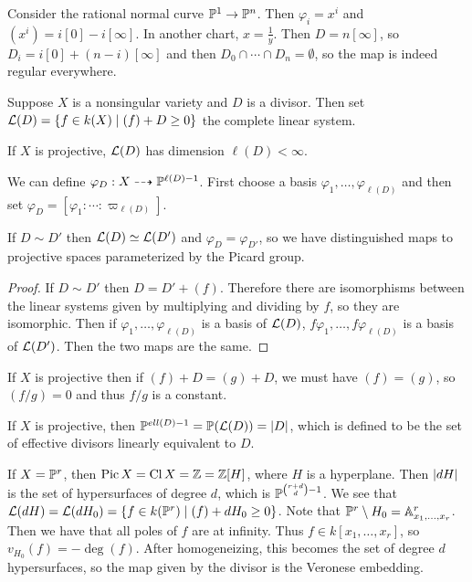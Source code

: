 \documentclass[twoside, 10pt]{article}
\begin{document}
        \begin{exm}
            Consider the rational normal curve $\P^1 \to \P^n$. Then $\varphi_i = x^i$ and $(x^i) = i[0]-i[\infty]$. In another chart, $x = \frac{1}{y}$. Then $D = n[\infty]$, so $D_i = i[0]+(n-i)[\infty]$ and then $D_0 \cap \cdots \cap D_n = \emptyset$, so the map is indeed regular everywhere.
        \end{exm}

        Suppose $X$ is a nonsingular variety and $D$ is a divisor. Then set $\mc{L}(D) = \{f \in k(X) \mid (f) + D \geq 0 \}$ the complete linear system.

        \begin{thm}[Serre]
            If $X$ is projective, $\mc{L}(D)$ has dimension $\ell(D) < \infty$.
        \end{thm}

        We can define $\varphi_D: X \dashrightarrow \P^{\ell(D)-1}$. First choose a basis $\varphi_1, \ldots, \varphi_{\ell(D)}$ and then set $\varphi_D = [\varphi_1: \cdots : \varpi_{\ell(D)}]$.

        \begin{lem}
            If $D \sim D'$ then $\mc{L}(D) \simeq \mc{L}(D')$ and $\varphi_D = \varphi_{D'}$, so we have distinguished maps to projective spaces parameterized by the Picard group.
            \begin{proof}
                If $D \sim D'$ then $D = D'+(f)$. Therefore there are isomorphisms between the linear systems given by multiplying and dividing by $f$, so they are isomorphic. Then if $\varphi_1, \ldots, \varphi_{\ell(D)}$ is a basis of $\mc{L}(D)$, $f \varphi_1, \ldots, f \varphi_{\ell(D)}$ is a basis of $\mc{L}(D')$. Then the two maps are the same.
            \end{proof}
        \end{lem}

        \begin{rmk}
            If $X$ is projective then if $(f)+D = (g)+D$, we must have $(f) = (g)$, so $(f/g) = 0$ and thus $f/g$ is a constant.
        \end{rmk}

        If $X$ is projective, then $\P^{ell(D)-1} = \P(\mc{L}(D)) = \abs{D}$, which is defined to be the set of effective divisors linearly equivalent to $D$.

        \begin{exm}
            If $X= \P^r$, then $\operatorname{Pic}X = \operatorname{Cl}X = \Z = \Z[H]$, where $H$ is a hyperplane. Then $\abs{dH}$ is the set of hypersurfaces of degree $d$, which is $\P^{\binom{r+d}{d}-1}$. We see that $\mc{L}(dH) = \mc{L}(dH_0) = \{f \in k(\P^r) \mid (f) + dH_0 \geq 0 \}$. Note that $\P^r \setminus H_0 = \A^r_{x_1, \ldots, x_r}$. Then we have that all poles of $f$ are at infinity. Thus $f \in k[x_1, \ldots, x_r]$, so $v_{H_0}(f) = - \operatorname{deg}(f)$. After homogeneizing, this becomes the set of degree $d$ hypersurfaces, so the map given by the divisor is the Veronese embedding.
        \end{exm}
        
\end{document}
